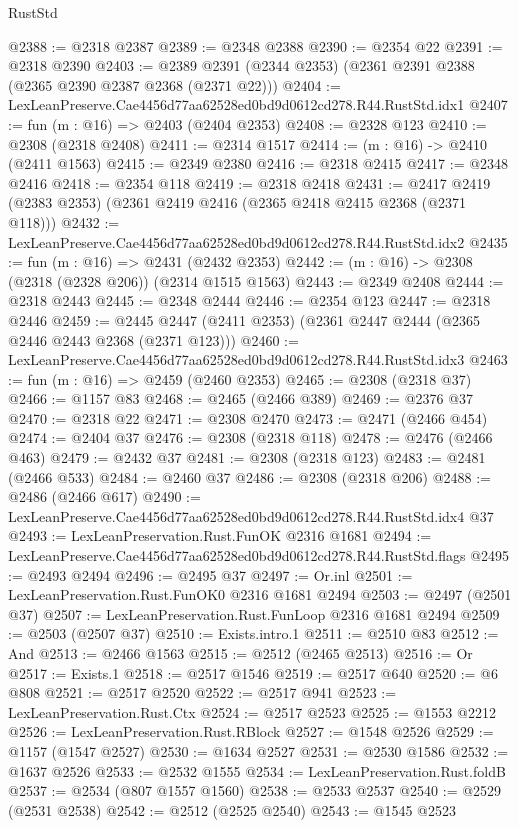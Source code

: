 \begin{lexlean}{RustStd}
\begin{coremodule}
@2388 := @2318 @2387
@2389 := @2348 @2388
@2390 := @2354 @22
@2391 := @2318 @2390
@2403 := @2389 @2391 (@2344 @2353) (@2361 @2391 @2388 (@2365 @2390 @2387 @2368 (@2371 @22)))
@2404 := LexLeanPreserve.Cae4456d77aa62528ed0bd9d0612cd278.R44.RustStd.idx1
@2407 := fun (m : @16) => @2403 (@2404 @2353)
@2408 := @2328 @123
@2410 := @2308 (@2318 @2408)
@2411 := @2314 @1517
@2414 := (m : @16) -> @2410 (@2411 @1563)
@2415 := @2349 @2380
@2416 := @2318 @2415
@2417 := @2348 @2416
@2418 := @2354 @118
@2419 := @2318 @2418
@2431 := @2417 @2419 (@2383 @2353) (@2361 @2419 @2416 (@2365 @2418 @2415 @2368 (@2371 @118)))
@2432 := LexLeanPreserve.Cae4456d77aa62528ed0bd9d0612cd278.R44.RustStd.idx2
@2435 := fun (m : @16) => @2431 (@2432 @2353)
@2442 := (m : @16) -> @2308 (@2318 (@2328 @206)) (@2314 @1515 @1563)
@2443 := @2349 @2408
@2444 := @2318 @2443
@2445 := @2348 @2444
@2446 := @2354 @123
@2447 := @2318 @2446
@2459 := @2445 @2447 (@2411 @2353) (@2361 @2447 @2444 (@2365 @2446 @2443 @2368 (@2371 @123)))
@2460 := LexLeanPreserve.Cae4456d77aa62528ed0bd9d0612cd278.R44.RustStd.idx3
@2463 := fun (m : @16) => @2459 (@2460 @2353)
@2465 := @2308 (@2318 @37)
@2466 := @1157 @83
@2468 := @2465 (@2466 @389)
@2469 := @2376 @37
@2470 := @2318 @22
@2471 := @2308 @2470
@2473 := @2471 (@2466 @454)
@2474 := @2404 @37
@2476 := @2308 (@2318 @118)
@2478 := @2476 (@2466 @463)
@2479 := @2432 @37
@2481 := @2308 (@2318 @123)
@2483 := @2481 (@2466 @533)
@2484 := @2460 @37
@2486 := @2308 (@2318 @206)
@2488 := @2486 (@2466 @617)
@2490 := LexLeanPreserve.Cae4456d77aa62528ed0bd9d0612cd278.R44.RustStd.idx4 @37
@2493 := LexLeanPreservation.Rust.FunOK @2316 @1681
@2494 := LexLeanPreserve.Cae4456d77aa62528ed0bd9d0612cd278.R44.RustStd.flags
@2495 := @2493 @2494
@2496 := @2495 @37
@2497 := Or.inl
@2501 := LexLeanPreservation.Rust.FunOK0 @2316 @1681 @2494
@2503 := @2497 (@2501 @37)
@2507 := LexLeanPreservation.Rust.FunLoop @2316 @1681 @2494
@2509 := @2503 (@2507 @37)
@2510 := Exists.intro.{1}
@2511 := @2510 @83
@2512 := And
@2513 := @2466 @1563
@2515 := @2512 (@2465 @2513)
@2516 := Or
@2517 := Exists.{1}
@2518 := @2517 @1546
@2519 := @2517 @640
@2520 := @6 @808
@2521 := @2517 @2520
@2522 := @2517 @941
@2523 := LexLeanPreservation.Rust.Ctx
@2524 := @2517 @2523
@2525 := @1553 @2212
@2526 := LexLeanPreservation.Rust.RBlock
@2527 := @1548 @2526
@2529 := @1157 (@1547 @2527)
@2530 := @1634 @2527
@2531 := @2530 @1586
@2532 := @1637 @2526
@2533 := @2532 @1555
@2534 := LexLeanPreservation.Rust.foldB
@2537 := @2534 (@807 @1557 @1560)
@2538 := @2533 @2537
@2540 := @2529 (@2531 @2538)
@2542 := @2512 (@2525 @2540)
@2543 := @1545 @2523

\end{coremodule}
\end{lexlean}
